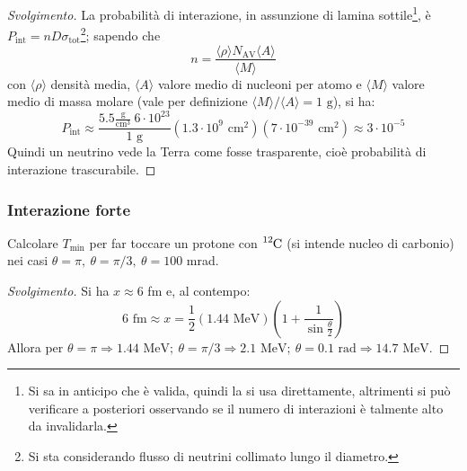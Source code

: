 \documentclass[10pt, a4paper]{scrartcl}
\numberwithin{equation}{subsection}
\theoremstyle{style1}
\renewcommand\qedsymbol{$\blacksquare$}
\newenvironment{svolgimento}{\renewcommand\qedsymbol{$\spadesuit$}\begin{proof}[Svolgimento]}{\end{proof}}
\begin{document}
\begin{svolgimento}
	La probabilit\`a di interazione, in assunzione di lamina sottile\footnote{Si sa in anticipo che \`e valida, quindi la si usa direttamente, altrimenti si pu\`o verificare a posteriori osservando se il numero di interazioni \`e talmente alto da invalidarla.}, \`e $P_\text{int} = n D\sigma _\text{tot}$\footnote{Si sta considerando flusso di neutrini collimato lungo il diametro.}; sapendo che 
	\[
	n = \frac{\langle \rho  \rangle N_\text{AV} \langle A \rangle}{\langle M \rangle}
	\] 
	con $\langle \rho  \rangle$ densit\`a media, $\langle A \rangle$ valore medio di nucleoni per atomo e $\langle M \rangle$ valore medio di massa molare (vale per definizione $\langle M \rangle / \langle A \rangle =1 \text{ g}$), si ha:
	\[
	P_\text{int} \approx \frac{5.5 \frac{\text{g}}{\text{cm}^3} \ 6 \cdot 10^{23} }{1 \text{ g}} (1.3 \cdot 10^9 \text{ cm}^2) (7 \cdot 10^{-39} \text{ cm}^2) \approx 3 \cdot 10^{-5} 
	\] 
Quindi un neutrino vede la Terra come fosse trasparente, cio\`e probabilit\`a di interazione trascurabile.	
\end{svolgimento}
\subsubsection{Interazione forte}

Calcolare $T_\text{min}$ per far toccare un protone con $\ce{^12C}$ (si intende nucleo di carbonio) nei casi $\theta = \pi, \ \theta  = \pi / 3, \ \theta = 100$ mrad.

\begin{svolgimento}
Si ha $x \approx 6$ fm e, al contempo:
\[
6 \text{ fm}\approx x = \frac{1}{2}(1.44 \text{ MeV}) \left(1+\frac{1}{\sin\frac{\theta}{2}}\right) 
\] 
Allora per $\theta = \pi\Rightarrow 1.44 \text{ MeV};\ \theta = \pi / 3 \Rightarrow 2.1 \text{ MeV}; \ \theta = 0.1 \text{ rad}\Rightarrow 14.7 \text{ MeV}$.
\end{svolgimento}
\end{document}
